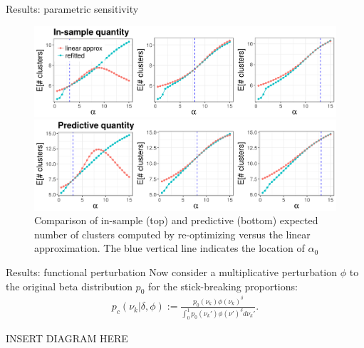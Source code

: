 \documentclass[10pt]{beamer}\usepackage[]{graphicx}\usepackage[]{color}
\newenvironment{knitrout}{}{} %
\begin{document}
\begin{frame}{Results: parametric sensitivity}

\begin{figure}
\centering
\begin{knitrout}
\color{fgcolor}

{\centering \includegraphics[width=0.98\linewidth,height=0.294\linewidth]{figure/param_sens_plot_thresh_0-1} 

}



\end{knitrout}
\begin{knitrout}
\color{fgcolor}

{\centering \includegraphics[width=0.98\linewidth,height=0.294\linewidth]{figure/param_sens_plot_thresh_0b-1} 

}



\end{knitrout}
\caption{Comparison of in-sample (top) and predictive (bottom) expected number of clusters computed by re-optimizing versus the linear approximation. 
The blue vertical line indicates the location of $\alpha_0$}
\end{figure}

\end{frame}

\begin{frame}{Results: functional perturbation}
Now consider a multiplicative perturbation $\phi$ to
the original beta distribution $p_0$ for the stick-breaking proportions:
%
\begin{align*}
\label{eq:expon_perturb}
	p_c(\nu_k \vert \delta, \phi) :=
  \frac{p_{0}(\nu_k)\phi(\nu_k)^\delta}
       {\int_0^1 p_0(\nu_k')\phi(\nu')^\delta d\nu_k'}.
\end{align*}

INSERT DIAGRAM HERE 

\end{frame}
\end{document}
